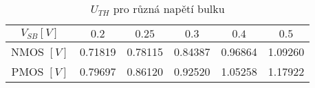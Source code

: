 \begin{table}[H]
    \centering
    \begin{tabular}{|c|c|c|c|c|c|}
        \hline
        \(V_{SB} [V]\) & \(0.2\)    & \(0.25\)  & \(0.3\)   & \(0.4\)   & \(0.5\) \\ \hline
        NMOS   \([V]\) & 0.71819    & 0.78115   & 0.84387   & 0.96864   & 1.09260 \\ \hline  
        PMOS   \([V]\) & 0.79697    & 0.86120   & 0.92520   & 1.05258   & 1.17922 \\ \hline  
    \end{tabular}
    \caption{\(U_{TH}\) pro různá napětí bulku}
    \label{tab:bulkEfekt}
\end{table}